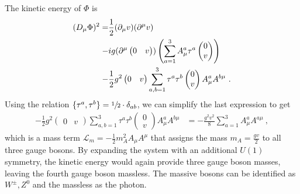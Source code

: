 The kinetic energy of $\Phi$ is
\begin{align}
	(D_\mu\Phi)^2 = &\frac{1}{2}(\partial_\mu v)(\partial^\mu v)\notag \\
	- &ig(\partial^\mu\begin{pmatrix} 0 & v \end{pmatrix}) \left(\sum_{a=1}^3A_\mu^a\tau^a\begin{pmatrix} 0 \\ v \end{pmatrix}\right)\notag \\
	- &\frac{1}{2}g^2\begin{pmatrix} 0 & v \end{pmatrix}\sum_{a,b=1}^{3}\tau^a\tau^b\begin{pmatrix} 0 \\ v \end{pmatrix}A_\mu^aA^{b\mu} \ .
\end{align}
Using the relation $\{\tau^a,\tau^b\}=\sfrac{1}{2}\cdot\delta_{ab}$, we can simplify the last expression to get
\begin{align}
	- \frac{1}{2}g^2\begin{pmatrix} 0 & v \end{pmatrix}\sum_{a,b=1}^{3}\tau^a\tau^b\begin{pmatrix} 0 \\ v \end{pmatrix}A_\mu^aA^{b\mu} &= - \frac{g^2v^2}{8}\sum_{a=1}^{3}A_\mu^aA^{a\mu} \ ,
\end{align}
which is a mass term $\mathcal{L}_m = -\frac{1}{2}m_A^2A_\mu A^\mu$ that assigns the mass $m_A = \frac{gv}{2}$ to all three gauge bosons. By expanding the system with an additional $U(1)$ symmetry, the kinetic energy would again provide three gauge boson masses, leaving the fourth gauge boson massless. The massive bosons can be identified as $W^\pm,Z^0$ and the massless as the photon.



